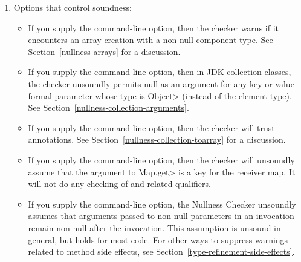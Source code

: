 \begin{enumerate}
\item
  Options that control soundness:

\begin{itemize}
\item
  \label{nullness-lint-soundArrayCreationNullness}%
  \label{nullness-lint-nonnullarraycomponents}%
  If you supply the  command-line
  option, then the checker warns if it encounters an array creation
  with a non-null component type.
  See Section~\ref{nullness-arrays} for a discussion.

\item
  \label{collection-object-parameters-may-be-null}
  If you supply the
  command-line option, then in JDK collection classes, the checker
  unsoundly permits null as an argument for any key or value formal
  parameter whose type is \<Object> (instead of the element type).
  See Section~\ref{nullness-collection-arguments}.

\item
  \label{nullness-lint-trustarraylenzero}%
  If you supply the  command-line option, then
  the checker will trust 
  annotations. See Section~\ref{nullness-collection-toarray} for a discussion.

\item
  \label{nullness-assumeKeyFor}%
  If you supply the  command-line option, then the
  checker will unsoundly assume that the argument to \<Map.get> is a key
  for the receiver map.  It will not do any checking of
   and related qualifiers.

\item
  \label{nullness-invocationPreservesArgumentNullness}%
  If you supply the  command-line
  option, the Nullness Checker unsoundly assumes that arguments passed to
  non-null parameters in an invocation remain non-null after the invocation.
  This assumption is unsound in general, but holds for most code.
  For other ways to suppress warnings related to method side effects, see
  Section~\ref{type-refinement-side-effects}.
\end{itemize}


\end{enumerate}
